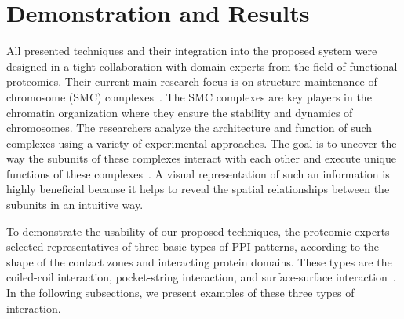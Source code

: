 \documentclass[twocolumn]{bmcart}%
\def\MatView {Matrix View\xspace}
\begin{document}


\section{Demonstration and Results}
All presented techniques and their integration into the proposed system were designed in a tight collaboration with domain experts from the field of functional proteomics.
Their current main research focus is on structure maintenance of chromosome (SMC) complexes~\cite{Palecek2015}. 
The SMC complexes are key players in the chromatin organization where they ensure the stability and dynamics of chromosomes. 
The researchers analyze the architecture and function of such complexes using a variety of experimental approaches. 
The goal is to uncover the way the subunits of these complexes interact with each other and execute unique functions of these complexes~\cite{Gligoris}. 
A visual representation of such an information is highly beneficial because it helps to reveal the spatial relationships between the subunits in an intuitive way.

To demonstrate the usability of our proposed techniques, the proteomic experts selected representatives of three basic types of PPI patterns, according to the shape of the contact zones and interacting protein domains.
These types are the coiled-coil interaction, pocket-string interaction, and surface-surface interaction~\cite{alberts02molecular}.
In the following subsections, we present examples of these three types of interaction. 
\end{document}
